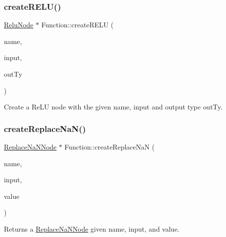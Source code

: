 \subsubsection{\texorpdfstring{create\+R\+E\+L\+U()}{createRELU()}\hspace{0.1cm}{\footnotesize\ttfamily [2/2]}}
{\footnotesize\ttfamily \hyperlink{classglow_1_1_relu_node}{Relu\+Node} $\ast$ Function\+::create\+R\+E\+LU (\begin{DoxyParamCaption}\item[{llvm\+::\+String\+Ref}]{name,  }\item[{\hyperlink{structglow_1_1_node_value}{Node\+Value}}]{input,  }\item[{\hyperlink{structglow_1_1_type}{Type\+Ref}}]{out\+Ty }\end{DoxyParamCaption})}

Create a Re\+LU node with the given {\ttfamily name}, {\ttfamily input} and output type {\ttfamily out\+Ty}. \mbox{\label{classglow_1_1_function_ad091697cc2cabe1ec8139eab16df6432}} 
\subsubsection{\texorpdfstring{create\+Replace\+Na\+N()}{createReplaceNaN()}}
{\footnotesize\ttfamily \hyperlink{classglow_1_1_replace_na_n_node}{Replace\+Na\+N\+Node} $\ast$ Function\+::create\+Replace\+NaN (\begin{DoxyParamCaption}\item[{llvm\+::\+String\+Ref}]{name,  }\item[{\hyperlink{structglow_1_1_node_value}{Node\+Value}}]{input,  }\item[{float}]{value }\end{DoxyParamCaption})}

\begin{DoxyReturn}{Returns}
a \hyperlink{classglow_1_1_replace_na_n_node}{Replace\+Na\+N\+Node} given {\ttfamily name}, {\ttfamily input}, and {\ttfamily value}. 
\end{DoxyReturn}
\mbox{\label{classglow_1_1_function_acac964783c66b57eb30d0d643cf73026}} 
